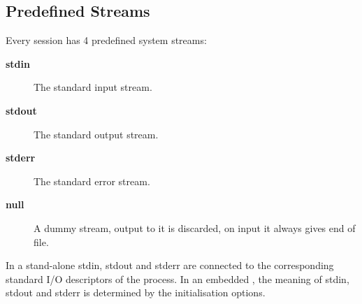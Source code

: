 \subsection{Predefined Streams}
Every {\eclipse} session has 4 predefined system streams:
\label{streams}
\begin{description}
\item[{\bf stdin}]	The standard input stream.

\item[{\bf stdout}]	The standard output stream.

\item[{\bf stderr}]	The standard error stream.

\item[{\bf null}]
A dummy stream, output to it is discarded, on input it always
gives end of file.
\end{description}
In a stand-alone {\eclipse} stdin, stdout and stderr are connected
to the corresponding standard I/O descriptors of the process.
In an embedded {\eclipse}, the meaning of stdin, stdout and
stderr is determined by the {\eclipse} initialisation options.


